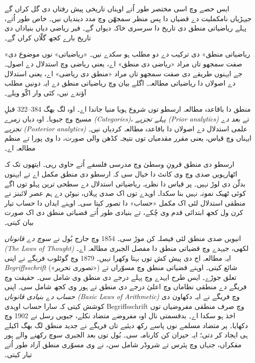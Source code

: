 \documentclass[../../../include/open-logic-section]{subfiles}
\begin{document}


ایس حصے وچ اسی مختصر طور اُتے اوہناں تاریخی پیش رفتاں دی گل
کراں گے جیہڑیاں نامکملیت دے قضیاں دا پس منظر سمجھّن وچ مدد
دیندیاں نیں۔ خاص طور اُتے، پہلے ریاضیاتی منطق دی تاریخ دا
سرسری خاکہ دیواں گے۔ فیر ریاضی دیاں بنیاداں دی تاریخ
بارے کجھ گلّاں کراں گے۔

\begin{digress}
  «ریاضیاتی منطق» دی ترکیب دے دو مطلب ہو سکدے نیں۔ «ریاضیاتی»
  نوں موضوع دی صفت سمجھو تاں مراد «ریاضی دی منطق» اے، یعنی
  ریاضی وچ استدلال دے اصول۔ جے ایہنوں طریقے دی صفت سمجھو
  تاں مراد «منطق دی ریاضی» اے، یعنی استدلال دے اصولاں دا
  ریاضیاتی مطالعہ۔ اگلے بیان وچ ریاضیاتی منطق دے ایہ دونیں
  مطلب آؤندے نیں، کئی وار اکّو ویلے۔
\end{digress}

منطق دا باقاعدہ مطالعہ ارسطو توں شروع ہویا منیا جاندا اے۔
اوہ لگ بھگ 384--322 \textsc{قبلِ مسیح} وچ جیویا۔ اوہ دیاں
\emph{زمرے (Categories)}، \emph{پہلے تجزیے (Prior
  analytics)} تے \emph{بعد دے تجزیے (Posterior analytics)}
علمی استدلال دے اصولاں دا باقاعدہ مطالعہ کردیاں نیں۔
ایہناں وچ قیاس، یعنی مقرر مقدمیاں توں نتیجہ کڈھن والی
صورت، دا وی پورا تے منظم مطالعہ اے۔

ارسطو دی منطق قرونِ وسطیٰ وچ مدرسی فلسفے اُتے حاوی رہی۔
ایتھوں تک کہ اٹھارہویں صدی وچ وی کانٹ دا خیال سی کہ
ارسطو دی منطق مکمل اے تے ایہنوں بدلّن دی لوڑ نہیں۔
پر قیاس دا نظریہ ریاضیاتی استدلال دے سطحی ترین پہلو توں
اگے کوئی ٹھیک نمونہ نہیں بنا سکدا۔ اوہدے توں اک صدی
پہلاں، نیوٹن دے ہم عصر لائبنز نے منطقی استدلال لئی
اک مکمل «حساب» دا تصور کیتا سی۔ اوہنے ایداں دا حساب
تیار کرن ول کجھ ابتدائی قدم وی چُکے، تے بنیادی طور اُتے
قضیاتی منطق دی اک صورت بیان کیتی۔

انیویں صدی منطق لئی فیصلہ کن موڑ سی۔ 1854 وچ
جارج بُول نے \emph{سوچ دے قانوناں (The Laws of Thought)}
لکھی، جیہدے وچ قضیاتی منطق دا مفصل الجبری مطالعہ اے۔
ایہ مطالعہ اج دی پیش کش توں بہتا وکھرا نہیں۔ 1879 وچ
گوٹلوب فریگے نے اپنی \emph{Begriffsschrift}
(«تصوری تحریر») شائع کیتی۔ اوہنے قضیاتی منطق وچ
مسوّراں تے تعلق جوڑے۔ ایس طرح ایہدے وچ
پہلے درجے دی منطق وی شامل سی۔ حقیقت وچ فریگے دے
منطقی نظاماں وچ اعلیٰ درجے دی منطق تے ہور وی کجھ
شامل سی۔ اپنی \emph{حساب دے بنیادی قانوناں
  (Basic Laws of Arithmetic)} وچ فریگے نے ایہ
دکھاون دی کوشش کیتی کہ سارا حساب اوہدی
Begriffsschrift وچ صرف منطقی مفروضیاں توں اخذ
ہو سکدا اے۔ بدقسمتی نال اوہ مفروضے متضاد نکلے،
جیویں رسل نے 1902 وچ دکھایا۔ پر متضاد مسلمے
نوں پاسے رکھ دیئیے تاں فریگے نے جدید منطق لگ بھگ
اکیلے ہی ایجاد کر دتی؛ ایہ حیران کن کارنامہ سی۔
بُول توں بعد الجبری سوچ رکھنے والے ہور مفکراں،
جنہاں وچ پئرس تے شروڈر شامل سن، نے وی
مسوّری منطق آزاد طور اُتے تیار کیتی۔
\end{document}
